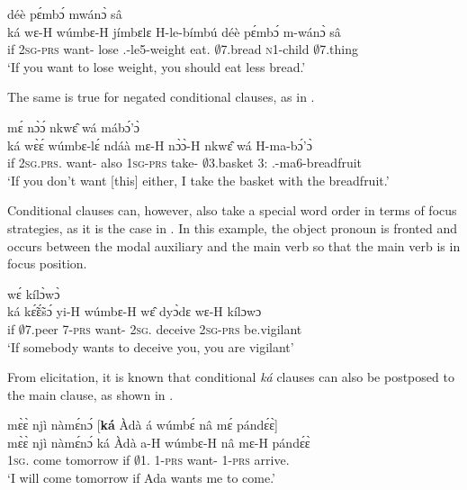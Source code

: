 \ea\label{ka2}
  \textsubscript{{\COND}} déè pɛ́mbɔ́ mwánɔ̀ sâ\\
         {\db}ká wɛ-H wúmbɛ-H jímbɛlɛ H-le-bímbú déè pɛ́mbɔ́ m-wánɔ̀ sâ\\
        {\db}if 2\textsc{sg}-\textsc{prs} want-{\R} lose {\OBJ}.{\LINK}-le5-weight eat.{\SBJV} $\emptyset$7.bread \textsc{n}1-child $\emptyset$7.thing\\
    \trans `If you want to lose weight, you should eat less bread.'
\z

\noindent The same is true for negated conditional clauses, as in .


\ea\label{ka3}
  \textsubscript{{\COND}} mɛ́ nɔ̀ɔ́ nkwɛ̂ wá mábɔ́'ɔ̀\\
        {\db}ká wɛ̀ɛ́ wúmbɛ-lɛ́ ndáà mɛ-H nɔ̀ɔ̀-H nkwɛ̂ wá H-ma-bɔ́'ɔ̀\\
         {\db}if 2\textsc{sg}.\textsc{prs}.{\NEG} want-{\NEG} also 1\textsc{sg}-\textsc{prs} take-{\R} $\emptyset$3.basket 3:{\ATT} {\OBJ}.{\LINK}-ma6-breadfruit\\
    \trans `If you don't want [this] either, I take the basket with the breadfruit.'
\z

Conditional clauses can, however, also take a special word order in terms of focus strategies, as it is the case in . In this example, the object pronoun is fronted and occurs between the modal auxiliary and the main verb so that the main verb is in focus position.


\ea\label{ka4}
  \textsubscript{{\COND}} wɛ́ kílɔ̀wɔ̀\\
        {\db}ká kɛ̃́ɛ̃́sɔ́ yi-H wúmbɛ-H wɛ̂ dyɔ̀dɛ wɛ-H kílɔwɔ\\
         {\db}if $\emptyset$7.peer 7-\textsc{prs} want-{\R} 2\textsc{sg}.{\OBJ} deceive 2\textsc{sg}-\textsc{prs} be.vigilant\\
    \trans `If somebody wants to deceive you, you are vigilant'
\z

\noindent From elicitation, it is known that conditional {\itshape ká} clauses can also be postposed to the main clause, as shown in .


\ea\label{ka5}
  \glll mɛ̀ɛ̀ njì nàmɛ́nɔ́ [{\bfseries ká} Àdà á wúmbɛ́ nâ mɛ́ pándɛ́ɛ̀]\textsubscript{{\COND}}\\
       mɛ̀ɛ̀ njì nàmɛ́nɔ́ {\db}ká Àdà a-H wúmbɛ-H nâ mɛ-H pándɛ́ɛ̀\\
       1\textsc{sg}.{\FUT} come tomorrow {\db}if $\emptyset$1.{\PN} 1-\textsc{prs} want-{\R} {\COMP} 1-\textsc{prs} arrive.{\SBJV}\\
    \trans `I will come tomorrow if Ada wants me to come.'
\z



